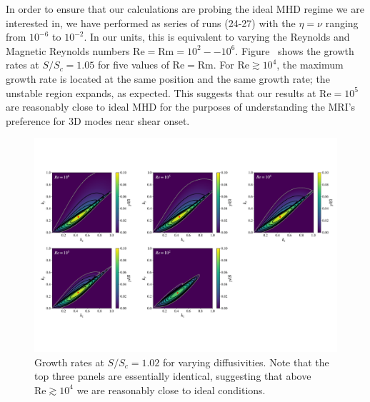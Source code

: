 \documentclass[aps,prl,preprint
,superscriptaddress]{revtex4-1}
\newcommand{\SSC}{S/S_{c}}
\newcommand{\Reyn}{\mathrm{Re}}
\newcommand{\Reym}{\mathrm{Rm}}
\begin{document}
In order to ensure that our calculations are probing the ideal MHD regime we are interested in, we have performed as series of runs (24-27) with the $\eta = \nu$ ranging from $10^{-6}$ to $10^{-2}$.
In our units, this is equivalent to varying the Reynolds and Magnetic Reynolds numbers $\Reyn = \Reym = 10^2 -- 10^6$.
Figure~\pageref{fig:reynolds} shows the growth rates at $\SSC=1.05$ for five values of $\Reyn = \Reym$.
For $\Reyn \gtrsim 10^4$, the maximum growth rate is located at the same position and the same growth rate; the unstable region expands, as expected.
This suggests that our results at $\Reyn = 10^5$ are reasonably close to ideal MHD for the purposes of understanding the MRI's preference for 3D modes near shear onset.
\begin{figure}[h!]
  \centering
  \includegraphics[width=\textwidth]{re_plots.pdf}
  \caption{Growth rates at $\SSC = 1.02$ for varying diffusivities. Note that the top three panels are essentially identical, suggesting that above $\Reyn \gtrsim 10^4$ we are reasonably close to ideal conditions.}
  \label{fig:reynolds}
\end{figure}
\end{document}
